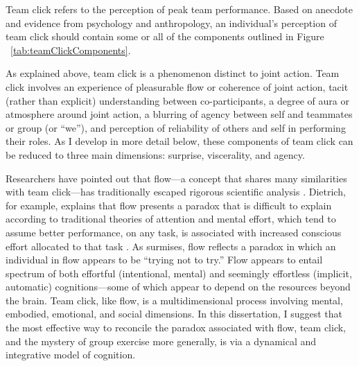 \begin{CJK}{UTF8}{gbsn}
Team click refers to the perception of peak team performance.  Based on anecdote and evidence from psychology and anthropology, an individual's perception of team click should contain some or all of the components outlined in Figure ~\ref{tab:teamClickComponents}.



As explained above, team click is a phenomenon distinct to joint action.  Team click involves an experience of pleasurable flow or coherence of joint action, tacit (rather than explicit) understanding between co-participants, a degree of aura or atmosphere around joint action, a blurring of agency between self and teammates or group (or ``we''), and perception of reliability of others and self in performing their roles. As I develop in more detail below, these components of team click can be reduced to three main dimensions: surprise, viscerality, and agency.

Researchers have pointed out that flow---a concept that shares many similarities with team click---has traditionally escaped rigorous scientific analysis \citep{Dietrich2010a,Slingerland2014}.  Dietrich, for example, explains that flow presents a paradox that is difficult to explain according to traditional theories of attention and mental effort, which tend to assume better performance, on any task, is associated with increased conscious effort allocated to that task \citep{Dietrich2004b}.  As \textcite{Slingerland2014} surmises, flow reflects a paradox in which an individual in flow appears to be ``trying not to try.''  Flow appears to entail spectrum of both effortful (intentional, mental) and seemingly effortless (implicit, automatic) cognitions---some of which appear to depend on the resources beyond the brain.  Team click, like flow, is a multidimensional process involving mental, embodied, emotional, and social dimensions.  In this dissertation, I suggest that the most effective way to reconcile the paradox associated with flow, team click, and the mystery of group exercise more generally, is via a dynamical and integrative model of cognition.


\end{CJK}
